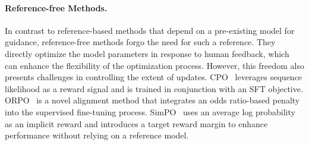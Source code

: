 \paragraph{Reference-free Methods.}
In contrast to reference-based methods that depend on a pre-existing model for guidance, reference-free methods forgo the need for such a reference. They directly optimize the model parameters in response to human feedback, which can enhance the flexibility of the optimization process. However, this freedom also presents challenges in controlling the extent of updates. CPO~\citep{Xu2024ContrastivePO} leverages sequence likelihood as a reward signal and is trained in conjunction with an SFT objective. ORPO~\citep{Hong2024ORPOMP} is a novel alignment method that integrates an odds ratio-based penalty into the supervised fine-tuning process. SimPO~\citep{Meng2024SimPO} uses an average log probability as an implicit reward and introduces a target reward margin to enhance performance without relying on a reference model.